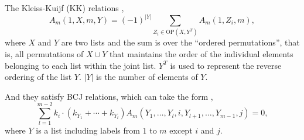 \documentclass[a4paper,11pt]{article}
\begin{document}
The Kleiss-Kuijf (KK) relations \cite{Kleiss:1988ne},
\begin{equation}\label{KK}
    A_m(1,X,m,Y)=(-1)^{|Y|}\sum_{Z_i
    \in \mathrm{OP}(X,Y^T)}A_m(1,Z_i,m),
\end{equation}
where $X$ and $Y$ are two lists and the sum is over the ``ordered permutations'', that is, all permutations of $X \cup Y$ that maintains the order of the individual elements belonging to each list within the joint list. 
$Y^T$ is used to represent the reverse ordering of the list $Y$. $|Y|$ is the number of elements of $Y$. \par
And they satisfy BCJ relations, which can take the form \cite{Bern:2008qj},
\begin{equation}\label{BCJ-relation}
    \sum_{l=1}^{m-2}k_i\cdot (k_{Y_1}+\cdots+k_{Y_{l}})A_m(Y_{1},\dots,Y_{l},i,Y_{l+1},\dots,Y_{m-1},j)=0,
\end{equation}
where $Y$ is a list including labels from $1$ to $m$ except $i$ and $j$.   
\end{document}
